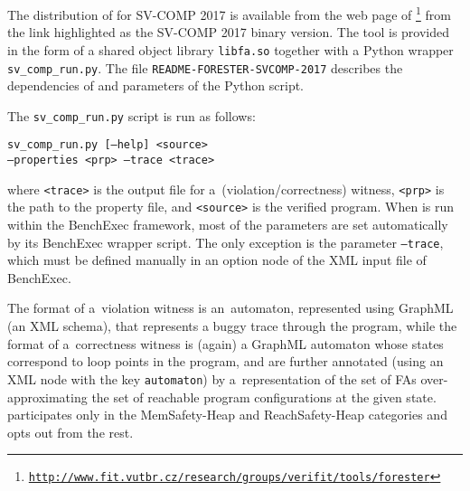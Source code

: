 The distribution of \forester{} for SV-COMP 2017 is available from the web page
of \forester{}\footnote{\href{http://www.fit.vutbr.cz/research/groups/verifit/tools/forester}
{\texttt{http://www.fit.vutbr.cz/research/groups/verifit/tools/forester}}} from the
link highlighted as the SV-COMP 2017 binary version.
The tool is provided in the form of a shared object
library \texttt{libfa.so} together with a Python wrapper
\texttt{sv\_comp\_run.py}.
The file \texttt{README-FORESTER-SVCOMP-2017} describes
the dependencies of \forester{} and parameters of the Python script.

The \texttt{sv\_comp\_run.py} script is run as follows: %

\begin{center}
  \vspace{-1.2mm}
  \begin{minipage}{8cm}
  \texttt{sv\_comp\_run.py [--help] <source>\\
  \hspace*{5.5mm}--properties <prp> --trace <trace> \\}
  \end{minipage}
  \vspace{-4.2mm}
\end{center}

\noindent
where \texttt{<trace>} is the output file for a~(violation/correctness)
witness, \texttt{<prp>} is the path to the property file, and \texttt{<source>}
is the verified program.
When \forester{} is run within the BenchExec framework, most of the parameters are set
automatically by its BenchExec wrapper script. The only exception is the parameter
\texttt{--trace}, which must be defined manually in an option node of the XML
input file of BenchExec.

The format of a~violation witness is an~automaton, represented using
GraphML (an XML schema), that represents a buggy trace through the program,
while the format of a~correctness witness is (again) a GraphML automaton whose
states correspond to loop points in the program, and are further annotated
(using an XML node with the key \texttt{automaton}) by
a~representation of the set of FAs over-approximating the set of
reachable program configurations at the given state.
\forester{} participates only in the MemSafety-Heap and ReachSafety-Heap categories
and opts out from the rest.

